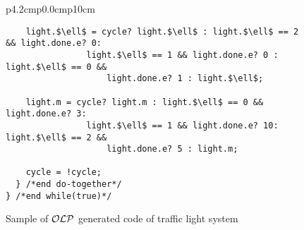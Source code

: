 \begin{figure*}
\begin{tabular}{p{4.2cm}p{0.0cm}p{10cm}}
\begin{lstlisting}
    light.$\ell$ = cycle? light.$\ell$ : light.$\ell$ == 2 && light.done.e? 0: 
                light.$\ell$ == 1 && light.done.e? 0 : light.$\ell$ == 0 && 
                    light.done.e? 1 : light.$\ell$; 
              
    light.m = cycle? light.m : light.$\ell$ == 0 && light.done.e? 3: 
                light.$\ell$ == 1 && light.done.e? 10: light.$\ell$ == 2 &&
                    light.done.e? 5 : light.m; 
    
    cycle = !cycle; 
  } /*end do-together*/ 
} /*end while(true)*/
\end{lstlisting}
\end{tabular}
\vspace{-2em}
\caption{Sample of $\mathcal{OLP}$ generated code of traffic light system}
\label{fig:caigtraffic}
\end{figure*}
